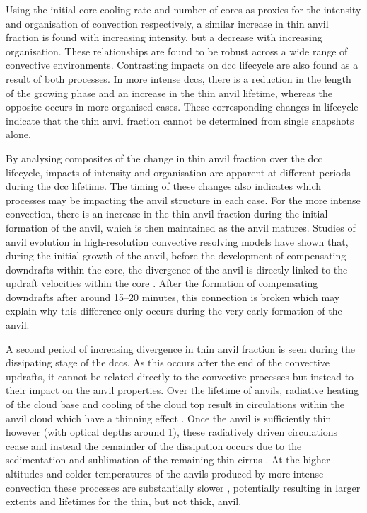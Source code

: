 Using the initial core cooling rate and number of cores as proxies for the intensity and organisation of convection respectively, a similar increase in thin anvil fraction is found with increasing intensity, but a decrease with increasing organisation.
These relationships are found to be robust across a wide range of convective environments.
Contrasting impacts on \acrshort{dcc} lifecycle are also found as a result of both processes.
In more intense \acrshort{dcc}s, there is a reduction in the length of the growing phase and an increase in the thin anvil lifetime, whereas the opposite occurs in more organised cases.
These corresponding changes in lifecycle indicate that the thin anvil fraction cannot be determined from single snapshots alone.

By analysing composites of the change in thin anvil fraction over the \acrshort{dcc} lifecycle, impacts of intensity and organisation are apparent at different periods during the \acrshort{dcc} lifetime.
The timing of these changes also indicates which processes may be impacting the anvil structure in each case.
For the more intense convection, there is an increase in the thin anvil fraction during the initial formation of the anvil, which is then maintained as the anvil matures.
Studies of anvil evolution in high-resolution convective resolving models have shown that, during the initial growth of the anvil, before the development of compensating downdrafts within the core, the divergence of the anvil is directly linked to the updraft velocities within the core \citep{senf_highresolution_2018}.
After the formation of compensating downdrafts after around 15--20 minutes, this connection is broken which may explain why this difference only occurs during the very early formation of the anvil.

A second period of increasing divergence in thin anvil fraction is seen during the dissipating stage of the \acrshort{dcc}s.
As this occurs after the end of the convective updrafts, it cannot be related directly to the convective processes but instead to their impact on the anvil properties.
Over the lifetime of anvils, radiative heating of the cloud base and cooling of the cloud top result in circulations within the anvil cloud which have a thinning effect \citep{gasparini_what_2019}.
Once the anvil is sufficiently thin however (with optical depths around 1), these radiatively driven circulations cease and instead the remainder of the dissipation occurs due to the sedimentation and sublimation of the remaining thin cirrus \citep{sokol_tropical_2020}.
At the higher altitudes and colder temperatures of the anvils produced by more intense convection these processes are substantially slower \citep{seeley_formation_2019}, potentially resulting in larger extents and lifetimes for the thin, but not thick, anvil.

